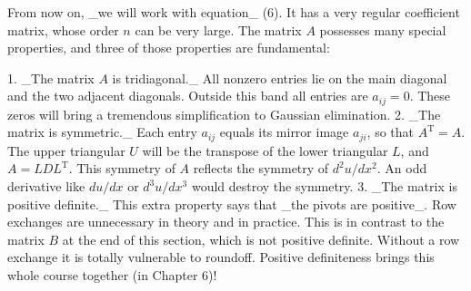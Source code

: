 From now on, _we will work with equation_ (6). It has a very regular coefficient matrix, whose order \(n\) can be very large. The matrix \(A\) possesses many special properties, and three of those properties are fundamental:

1. _The matrix \(A\) is tridiagonal._ All nonzero entries lie on the main diagonal and the two adjacent diagonals. Outside this band all entries are \(a_{ij}=0\). These zeros will bring a tremendous simplification to Gaussian elimination.
2. _The matrix is symmetric._ Each entry \(a_{ij}\) equals its mirror image \(a_{ji}\), so that \(A^{\mathrm{T}}=A\). The upper triangular \(U\) will be the transpose of the lower triangular \(L\), and \(A=LDL^{\mathrm{T}}\). This symmetry of \(A\) reflects the symmetry of \(d^{2}u/dx^{2}\). An odd derivative like \(du/dx\) or \(d^{3}u/dx^{3}\) would destroy the symmetry.
3. _The matrix is positive definite._ This extra property says that _the pivots are positive_. Row exchanges are unnecessary in theory and in practice. This is in contrast to the matrix \(B\) at the end of this section, which is not positive definite. Without a row exchange it is totally vulnerable to roundoff. Positive definiteness brings this whole course together (in Chapter 6)! 